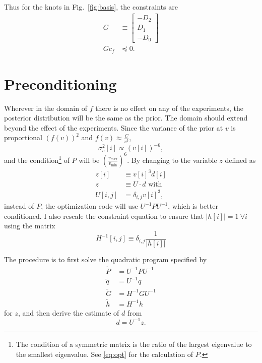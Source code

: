 \documentclass[11pt]{article}
\newcommand{\eos}{f}
\newcommand\cf{c_f}
\begin{document}
Thus for the knots in Fig.~\ref{fig:basis}, the constraints are
\begin{align}
  G & \equiv
      \begin{bmatrix}
        - D_2 \\ D_1 \\ -D_0
      \end{bmatrix}\\
  \label{eq:constraint}
  G\cf & \preceq 0.
\end{align}

\section{Preconditioning}
\label{sec:preconditioning}

Wherever in the domain of $\eos$ there is no effect on any of the
experiments, the posterior distribution will be the same as the prior.
The domain should extend beyond the effect of the experiments.
Since the variance of the prior at $v$ is proportional $(f(v))^2$ and
$f(v) \approx \frac{C}{v^3}$,
\begin{equation}
  \label{eq:var_f}
  \sigma^2_{c}[i] \propto (v[i])^{-6},
\end{equation}
and the condition\footnote{The condition of a symmetric matrix is the
  ratio of the largest eigenvalue to the smallest eigenvalue.  See
  \eqref{eq:opt} for the calculation of $P$.} of $P$ will be
$\left( \frac{v_{\text{max}}}{v_{\text{min}}} \right)^6$.  By
changing to the variable $z$ defined as
\begin{align*}
  z[i] &\equiv v[i]^3 d[i] \\
  z &\equiv U \cdot d \text{ with} \\
  U[i,j] &= \delta_{i,j} v[i]^3,
\end{align*}
\newcommand{\UI}{U^{-1}} instead of $P$, the optimization code will use
$\UI P \UI$, which is better conditioned.  I also rescale the
constraint equation to ensure that $\left| h[i] \right|=1~\forall i$
using the matrix
\begin{equation*}
  H^{-1}[i,j] \equiv \delta_{i,j} \frac{1}{\left|h[i]\right|}
\end{equation*}

The procedure is to first solve the quadratic program specified by
\begin{align*}
  \tilde P &= \UI P \UI \\
  \tilde q &= \UI q \\
  \tilde G &= H^{-1}G \UI \\
  \tilde h &= H^{-1}h
\end{align*}
for $z$, and then derive the estimate of $d$ from
\begin{equation*}
  d = \UI z.
\end{equation*}
\end{document}
